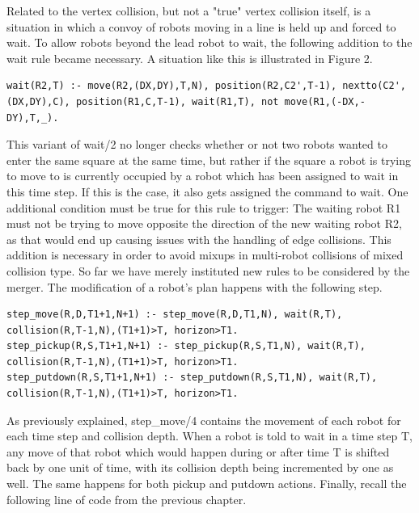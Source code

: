 \documentclass{llncs}
\begin{document}
Related to the vertex collision, but not a "true" vertex collision itself, is a situation in which a convoy of robots moving in a line is held up and forced to wait. To allow robots beyond the lead robot to wait, the following addition to the wait rule became necessary. A situation like this is illustrated in Figure 2.
\begin{lstlisting}[basicstyle=\fontsize{9}{11}\selectfont\ttfamily,frame=single,breaklines=true]
wait(R2,T) :- move(R2,(DX,DY),T,N), position(R2,C2',T-1), nextto(C2',(DX,DY),C), position(R1,C,T-1), wait(R1,T), not move(R1,(-DX,-DY),T,_).
\end{lstlisting}
This variant of wait/2 no longer checks whether or not two robots wanted to enter the same square at the same time, but rather if the square a robot is trying to move to is currently occupied by a robot which has been assigned to wait in this time step. If this is the case, it also gets assigned the command to wait.\newline\newline
One additional condition must be true for this rule to trigger: The waiting robot R1 must not be trying to move opposite the direction of the new waiting robot R2, as that would end up causing issues with the handling of edge collisions. This addition is necessary in order to avoid mixups in multi-robot collisions of mixed collision type.\newline\newline
So far we have merely instituted new rules to be considered by the merger. The modification of a robot's plan happens with the following step.
\begin{lstlisting}[basicstyle=\fontsize{9}{11}\selectfont\ttfamily,frame=single,breaklines=true]
step_move(R,D,T1+1,N+1) :- step_move(R,D,T1,N), wait(R,T), collision(R,T-1,N),(T1+1)>T, horizon>T1.
step_pickup(R,S,T1+1,N+1) :- step_pickup(R,S,T1,N), wait(R,T), collision(R,T-1,N),(T1+1)>T, horizon>T1.
step_putdown(R,S,T1+1,N+1) :- step_putdown(R,S,T1,N), wait(R,T), collision(R,T-1,N),(T1+1)>T, horizon>T1.
\end{lstlisting}\newpage
As previously explained, step\_move/4 contains the movement of each robot for each time step and collision depth. When a robot is told to wait in a time step T, any move of that robot which would happen during or after time T is shifted back by one unit of time, with its collision depth being incremented by one as well. The same happens for both pickup and putdown actions. Finally, recall the following line of code from the previous chapter.
\end{document}
